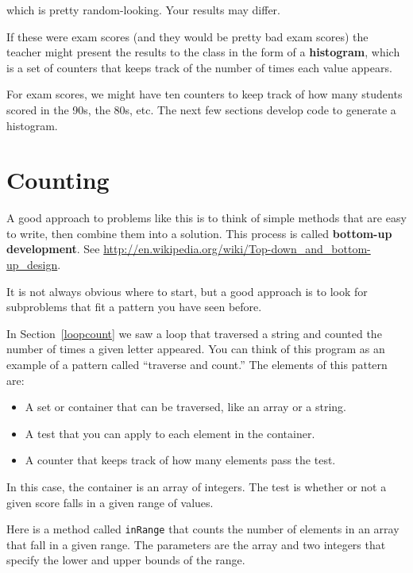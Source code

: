 which is pretty random-looking.  Your results may differ.

If these were exam scores (and they would be pretty bad exam
scores) the teacher might present the results to the class
in the form of a {\bf histogram}, which is a set of counters
that keeps track of the number of times each value appears.


For exam scores, we might have ten counters to keep track of
how many students scored in the 90s, the 80s, etc.  The next
few sections develop code to generate a histogram.


\section{Counting}

A good approach to problems like this is to think of simple methods
that are easy to write, then combine them into a solution.
This process is called {\bf bottom-up development}.
See \url{http://en.wikipedia.org/wiki/Top-down_and_bottom-up_design}.

It is not always obvious where to start,
but a good approach is to look for subproblems that fit a pattern you
have seen before.

In Section~\ref{loopcount} we saw a loop that traversed a
string and counted the number of times a given letter appeared.  You
can think of this program as an example of a pattern called ``traverse
and count.''  The elements of this pattern are:

\begin{itemize}

\item A set or container that can be traversed, like an array
or a string.

\item A test that you can apply to each element in the container.

\item A counter that keeps track of how many elements pass
the test.

\end{itemize}

In this case, the container is an array of integers.  The
test is whether or not a given score falls in a given range of
values.

Here is a method called {\tt inRange} that counts the number of
elements in an array that fall in a given range.  The parameters are
the array and two integers that specify the lower and upper bounds of
the range.

